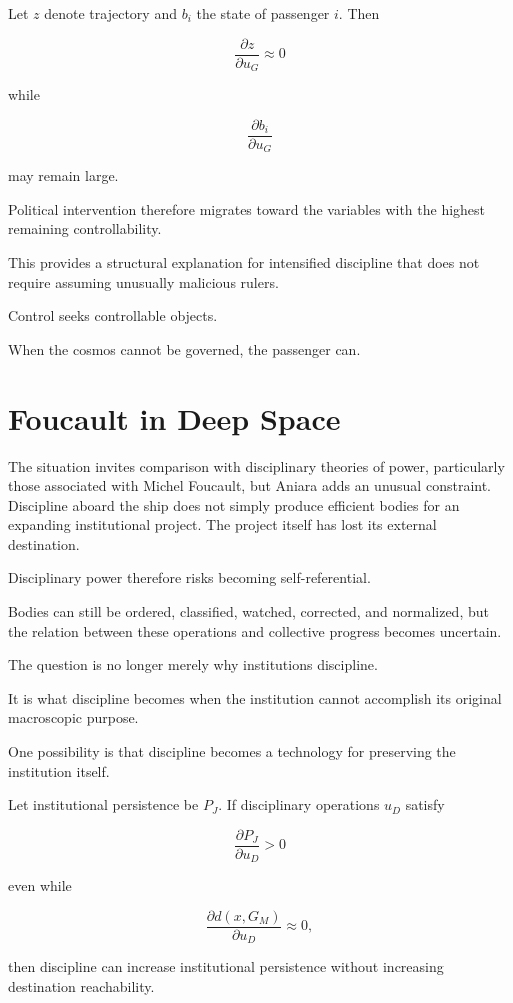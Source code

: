 \documentclass[11pt,oneside]{book}
\theoremstyle{definition}
\theoremstyle{remark}
\begin{document}
Let \(z\) denote trajectory and \(b_i\) the state of passenger \(i\). Then

\[
\frac{\partial z}{\partial u_G}\approx0
\]

while

\[
\frac{\partial b_i}{\partial u_G}
\]

may remain large.

Political intervention therefore migrates toward the variables with the highest remaining controllability.

This provides a structural explanation for intensified discipline that does not require assuming unusually malicious rulers.

Control seeks controllable objects.

When the cosmos cannot be governed, the passenger can.

\section{Foucault in Deep Space}

The situation invites comparison with disciplinary theories of power, particularly those associated with Michel Foucault, but Aniara adds an unusual constraint. Discipline aboard the ship does not simply produce efficient bodies for an expanding institutional project. The project itself has lost its external destination.

Disciplinary power therefore risks becoming self-referential.

Bodies can still be ordered, classified, watched, corrected, and normalized, but the relation between these operations and collective progress becomes uncertain.

The question is no longer merely why institutions discipline.

It is what discipline becomes when the institution cannot accomplish its original macroscopic purpose.

One possibility is that discipline becomes a technology for preserving the institution itself.

Let institutional persistence be \(P_J\). If disciplinary operations \(u_D\) satisfy

\[
\frac{\partial P_J}{\partial u_D}>0
\]

even while

\[
\frac{\partial d(x,G_M)}{\partial u_D}\approx0,
\]

then discipline can increase institutional persistence without increasing destination reachability.
\end{document}
